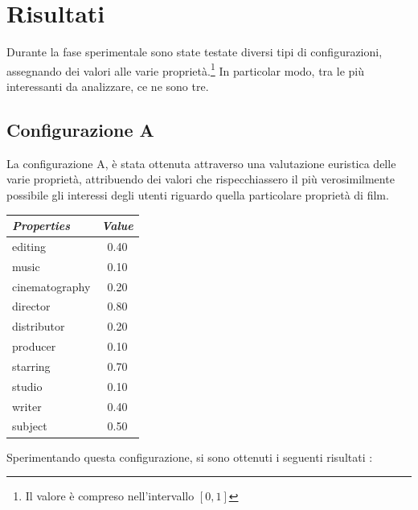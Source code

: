 \section{Risultati}
Durante la fase sperimentale sono state testate diversi tipi di configurazioni, assegnando dei valori alle varie proprietà.\footnote{Il valore è compreso nell'intervallo $[0,1]$} 
In particolar modo, tra le più interessanti da analizzare, ce ne sono tre.

\subsection{Configurazione A}
La configurazione A, è stata ottenuta attraverso una valutazione euristica delle varie proprietà, attribuendo dei valori che rispecchiassero il più verosimilmente possibile gli interessi degli utenti riguardo quella particolare proprietà di film.
\begin{table}[H]
\small
\centering
\begin{tabular}{l c}
\textit{Properties} & \textit{Value} \\\hline
editing & 0.40 \\
music & 0.10 \\
cinematography & 0.20 \\
director & 0.80 \\
distributor & 0.20 \\
producer & 0.10 \\
starring & 0.70 \\
studio & 0.10 \\
writer & 0.40 \\
subject & 0.50 \\
\end{tabular}
\end{table}
Sperimentando questa configurazione, si sono ottenuti i seguenti risultati : 

